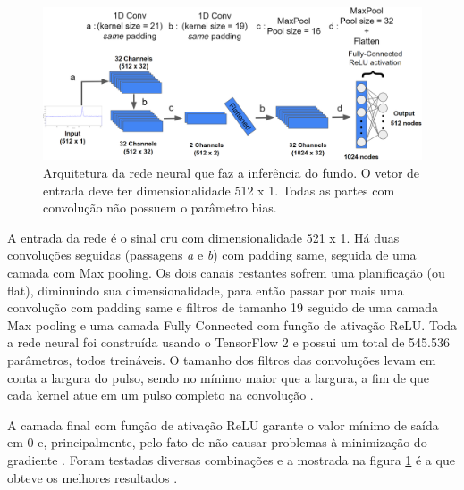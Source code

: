 \documentclass[a4paper,12pt,oneside]{book}
\begin{document}

\begin{figure}[H]
    \centering
    \includegraphics[scale = 0.238]{figs/Source to only bkg.png}
    \caption{Arquitetura da rede neural que faz a inferência do fundo. O vetor de entrada deve ter dimensionalidade 512 x 1. Todas as partes com convolução não possuem o parâmetro bias.}
    \label{fig:arq_source_to_bkg}
\end{figure}

\par A entrada da rede é o sinal cru com dimensionalidade 521 x 1. Há duas convoluções seguidas (passagens \textit{a} e \textit{b}) com padding same, seguida de uma camada com Max pooling. Os dois canais restantes sofrem uma planificação (ou flat), diminuindo sua dimensionalidade, para então passar por mais uma convolução com padding same e filtros de tamanho 19 seguido de uma camada Max pooling e uma camada Fully Connected com função de ativação ReLU. Toda a rede neural foi construída usando o TensorFlow 2 e possui um total de 545.536 parâmetros, todos treináveis. O tamanho dos filtros das convoluções levam em conta a largura do pulso, sendo no mínimo maior que a largura, a fim de que cada kernel atue em um pulso completo na convolução \cite{FORTINO2022166497}.

\par A camada final com função de ativação ReLU garante o valor mínimo de saída em 0 e, principalmente, pelo fato de não causar problemas à minimização do gradiente \cite{VGP}. Foram testadas diversas combinações e a mostrada na figura \ref{fig:arq_source_to_bkg} é a que obteve os melhores resultados \cite{FORTINO2022166497}. 
\end{document}
